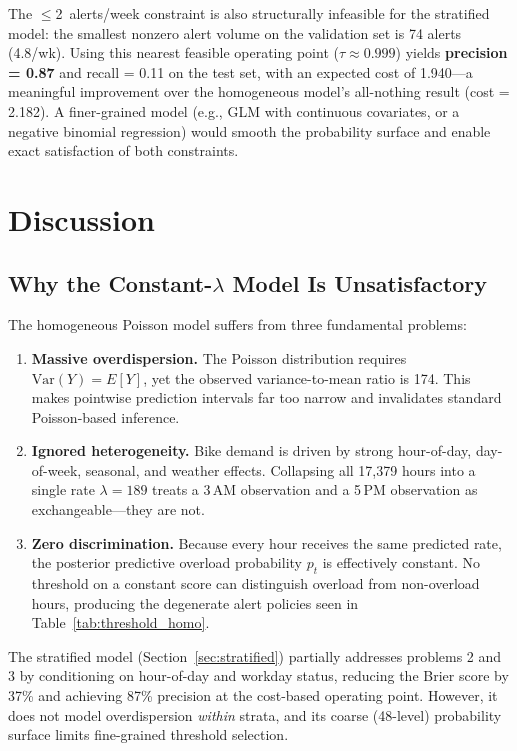 \documentclass[12pt]{article}
\begin{document}
The $\le$2~alerts/week constraint is also structurally infeasible for
the stratified model: the smallest nonzero alert volume on the
validation set is 74 alerts (4.8/wk).  Using this nearest feasible
operating point ($\tau \approx 0.999$) yields \textbf{precision =
0.87} and recall = 0.11 on the test set, with an expected cost of
1.940---a meaningful improvement over the homogeneous model's
all-nothing result (cost = 2.182).  A finer-grained model (e.g., GLM
with continuous covariates, or a negative binomial regression)
would smooth the probability surface and enable exact satisfaction of
both constraints.

\section{Discussion}
\label{sec:discussion}

\subsection{Why the Constant-$\lambda$ Model Is Unsatisfactory}

The homogeneous Poisson model suffers from three fundamental problems:

\begin{enumerate}
\item \textbf{Massive overdispersion.}  The Poisson distribution
  requires $\text{Var}(Y) = E[Y]$, yet the observed
  variance-to-mean ratio is 174.  This makes pointwise prediction
  intervals far too narrow and invalidates standard Poisson-based
  inference.

\item \textbf{Ignored heterogeneity.}  Bike demand is driven by
  strong hour-of-day, day-of-week, seasonal, and weather effects.
  Collapsing all 17,379 hours into a single rate $\lambda = 189$
  treats a 3\,AM observation and a 5\,PM observation as
  exchangeable---they are not.

\item \textbf{Zero discrimination.}  Because every hour receives
  the same predicted rate, the posterior predictive overload
  probability $p_t$ is effectively constant.  No threshold on a
  constant score can distinguish overload from non-overload hours,
  producing the degenerate alert policies seen in
  Table~\ref{tab:threshold_homo}.
\end{enumerate}

The stratified model (Section~\ref{sec:stratified}) partially
addresses problems 2 and 3 by conditioning on hour-of-day and workday
status, reducing the Brier score by 37\% and achieving 87\% precision
at the cost-based operating point.  However, it does not model
overdispersion \emph{within} strata, and its coarse (48-level)
probability surface limits fine-grained threshold selection.
\end{document}
